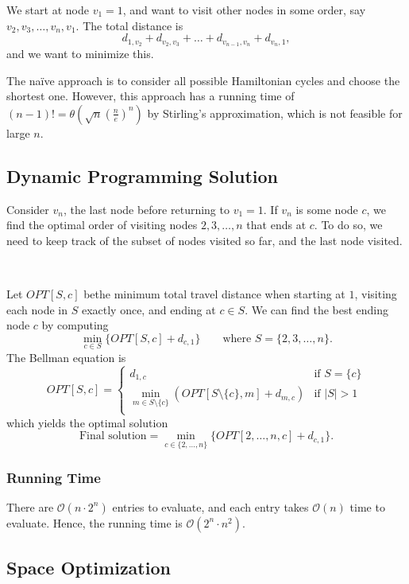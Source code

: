 We start at node $v_1 = 1$, and want to visit other nodes in some order, say $v_2, v_3, \dots, v_n, v_1$. The total distance is \[
    d_{1, v_2} + d_{v_2, v_3} + \dots + d_{v_{n-1}, v_n} + d_{v_n, 1},
\] and we want to minimize this.

The na\"ive approach is to consider all possible Hamiltonian cycles and choose the shortest one. However, this approach has a running time of $(n - 1)! = \theta\left( \sqrt{n} \left( \frac{n}{e} \right)^n \right)$ by Stirling's approximation, which is not feasible for large $n$.

\subsection{Dynamic Programming Solution}

Consider $v_n$, the last node before returning to $v_1 = 1$. If $v_n$ is some node $c$, we find the optimal order of visiting nodes $2, 3, \dots, n$ that ends at $c$. To do so, we need to keep track of the subset of nodes visited so far, and the last node visited.

{~~~}

Let $OPT[S, c]$ bethe minimum total travel distance when starting at $1$, visiting each node in $S$ exactly once, and ending at $c \in S$. We can find the best ending node $c$ by computing \[
    \min_{c \in S} \{ OPT[S, c] + d_{c,1} \} \qquad \text{where } S = \{2, 3, \dots, n\}.
\] The Bellman equation is \[
    OPT[S, c] = \begin{cases}
        d_{1, c}                                                                & \text{if } S = \{ c \} \\
        \displaystyle
        \min_{m \in S \setminus \{c\}} ( OPT[S \setminus \{c\}, m] + d_{m, c} ) & \text{if } |S| > 1     \\
    \end{cases}
\] which yields the optimal solution \[
    \text{Final solution} = \min_{c \in \{ 2, \dots, n \}} \{ OPT[{2, \dots, n}, c] + d_{c, 1} \}.
\]

\subsubsection{Running Time}

There are $\mathcal{O}(n \cdot 2^n)$ entries to evaluate, and each entry takes $\mathcal{O}(n)$ time to evaluate. Hence, the running time is $\mathcal{O}(2^n \cdot n^2)$.

\subsection{Space Optimization}

